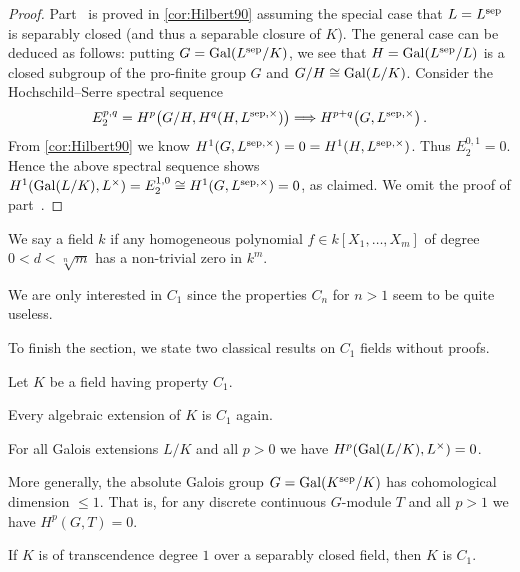 \documentclass[a4paper, 10pt, oneside, DIV=9, chapterprefix=true, numbers=enddot, bibliography=totoc]{scrbook}
\begin{document}
\begin{proof}
	Part~ is proved in \cref{cor:Hilbert90} assuming the special case that $L=L^{\mathrm{sep}}$ is separably closed (and thus a separable closure of $K$). The general case can be deduced as follows: putting $G=\operatorname{Gal}(L^{\mathrm{sep}}/K)$, we see that $H=\operatorname{Gal}(L^{\mathrm{sep}}/L)$ is a closed subgroup of the pro-finite group $G$ and $G/H\cong \operatorname{Gal}(L/K)$. Consider the Hochschild--Serre spectral sequence
	\begin{equation*}
		E_2^{p,q}=H^p\big(G/H,H^q(H,L^{\sep,\times})\big)\converge H^{p+q}\big(G,L^{\sep,\times}\big)\,.
	\end{equation*}
	From \cref{cor:Hilbert90} we know $H^1(G,L^{\mathrm{sep},\times})=0=H^1(H,L^{\mathrm{sep},\times})$. Thus $E_2^{0,1}=0$. Hence the above spectral sequence shows $H^1(\operatorname{Gal}(L/K),L^\times)=E_2^{1,0}\cong H^1(G,L^{\mathrm{sep},\times})=0$, as claimed. We omit the proof of part~.
\end{proof}
\begin{defi}
	We say a field $k$  if any homogeneous polynomial $f\in k[X_1,\dotsc,X_m]$ of degree $0<d<\sqrt[n]{m}$ has a non-trivial zero in $k^m$.
\end{defi}
\begin{rem}
	We are only interested in $C_1$ since the properties $C_n$ for $n>1$ seem to be quite useless.
\end{rem}
To finish the section, we state two classical results on $C_1$ fields without proofs.
\begin{prop}
	Let $K$ be a field having property $C_1$.
	\begin{alphanumerate}
		\item Every algebraic extension of $K$ is $C_1$ again.
		\item For all Galois extensions $L/K$ and all $p>0$ we have $H^p(\operatorname{Gal}(L/K),L^{\times})=0$.
		\item More generally, the absolute Galois group $G=\operatorname{Gal}(K^{\mathrm{sep}}/K)$ has cohomological dimension $\leq 1$. That is, for any discrete continuous $G$-module $T$ and all $p>1$ we have $H^p(G,T)=0$.
	\end{alphanumerate}
\end{prop}
\begin{prop}[Tsen]
	If $K$ is of transcendence degree $1$ over a separably closed field, then $K$ is $C_1$.
\end{prop}
\end{document}
